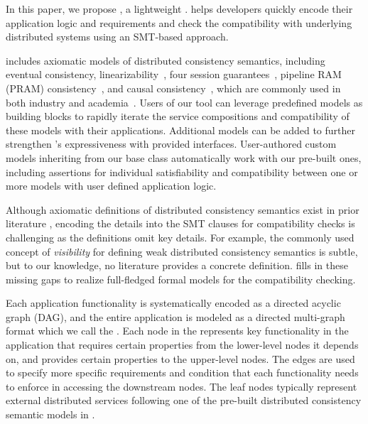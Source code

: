 In this paper, we propose \sysname{}, a lightweight \sysnamelong{}. \sysname{}
helps developers quickly encode their application logic and
requirements and check the compatibility with underlying distributed
systems using an SMT-based approach.

\sysname{} includes axiomatic models of distributed consistency
semantics, including eventual consistency,
linearizability~\cite{viotti2016consistency}, four session
guarantees~\cite{terry1994session}, pipeline RAM (PRAM) consistency~\cite{pram},
and causal consistency~\cite{causaldef}, which are commonly used in both
industry and academia~\cite{pileus, cosmosdb, anna, bayou, yogurt,
pnuts, cloudflare-session, causalmemory, cops}.
Users of our tool can leverage predefined models as
building blocks to rapidly iterate the service compositions and compatibility
of these models with their applications. Additional models can be
added to further
strengthen \sysname{}'s expressiveness with provided interfaces.
User-authored custom models inheriting from our base class automatically work with our pre-built ones,
including assertions for individual satisfiability and compatibility between one or more models
with user defined application logic.

Although axiomatic definitions of distributed consistency semantics
exist in prior literature \cite{finkbeiner2007smt,
  tekken2017monitoring, kuper2019toward, fan2023satisfiability,
ma2024noctua}, encoding the details into the SMT
clauses for compatibility checks is challenging as the definitions
omit key details. For example, the commonly used concept
of \textit{visibility} for defining weak distributed consistency
semantics is subtle, but to our knowledge, no literature provides
a concrete definition. \sysname{} fills in these missing gaps to realize
full-fledged formal models for the compatibility checking.

Each application functionality is systematically encoded as a
directed acyclic graph (DAG), and the entire application is modeled as
a directed multi-graph format which we call the \sysgraph{}.
Each node in the \sysgraph{} represents key functionality in the application
that requires certain properties from the lower-level nodes it depends on,
and provides certain properties to the upper-level nodes.
The edges are used to specify more specific requirements and condition that each
functionality needs to enforce in accessing the downstream nodes.
The leaf nodes typically represent external distributed services
following one of the pre-built distributed consistency semantic models
in \sysname{}.

